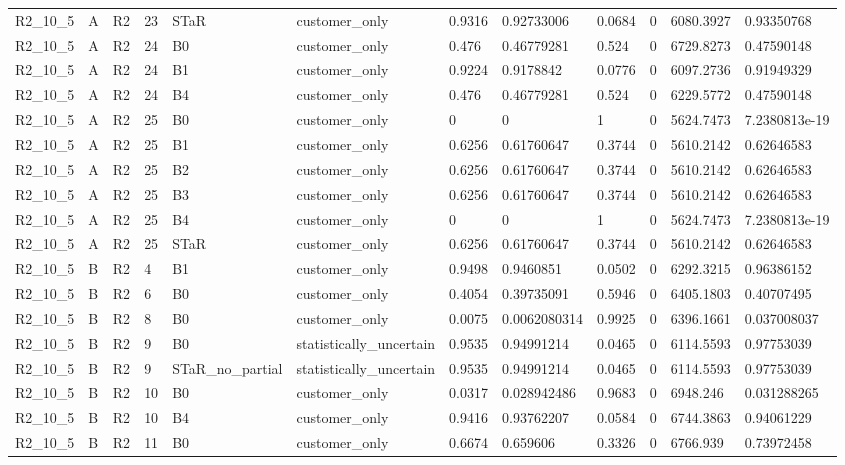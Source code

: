 \begin{longtable}{llllllllllll}
R2\_10\_5 & A & R2 & 23 & STaR & customer\_only & 0.9316 & 0.92733006 & 0.0684 & 0 & 6080.3927 & 0.93350768 \\
R2\_10\_5 & A & R2 & 24 & B0 & customer\_only & 0.476 & 0.46779281 & 0.524 & 0 & 6729.8273 & 0.47590148 \\
R2\_10\_5 & A & R2 & 24 & B1 & customer\_only & 0.9224 & 0.9178842 & 0.0776 & 0 & 6097.2736 & 0.91949329 \\
R2\_10\_5 & A & R2 & 24 & B4 & customer\_only & 0.476 & 0.46779281 & 0.524 & 0 & 6229.5772 & 0.47590148 \\
R2\_10\_5 & A & R2 & 25 & B0 & customer\_only & 0 & 0 & 1 & 0 & 5624.7473 & 7.2380813e-19 \\
R2\_10\_5 & A & R2 & 25 & B1 & customer\_only & 0.6256 & 0.61760647 & 0.3744 & 0 & 5610.2142 & 0.62646583 \\
R2\_10\_5 & A & R2 & 25 & B2 & customer\_only & 0.6256 & 0.61760647 & 0.3744 & 0 & 5610.2142 & 0.62646583 \\
R2\_10\_5 & A & R2 & 25 & B3 & customer\_only & 0.6256 & 0.61760647 & 0.3744 & 0 & 5610.2142 & 0.62646583 \\
R2\_10\_5 & A & R2 & 25 & B4 & customer\_only & 0 & 0 & 1 & 0 & 5624.7473 & 7.2380813e-19 \\
R2\_10\_5 & A & R2 & 25 & STaR & customer\_only & 0.6256 & 0.61760647 & 0.3744 & 0 & 5610.2142 & 0.62646583 \\
R2\_10\_5 & B & R2 & 4 & B1 & customer\_only & 0.9498 & 0.9460851 & 0.0502 & 0 & 6292.3215 & 0.96386152 \\
R2\_10\_5 & B & R2 & 6 & B0 & customer\_only & 0.4054 & 0.39735091 & 0.5946 & 0 & 6405.1803 & 0.40707495 \\
R2\_10\_5 & B & R2 & 8 & B0 & customer\_only & 0.0075 & 0.0062080314 & 0.9925 & 0 & 6396.1661 & 0.037008037 \\
R2\_10\_5 & B & R2 & 9 & B0 & statistically\_uncertain & 0.9535 & 0.94991214 & 0.0465 & 0 & 6114.5593 & 0.97753039 \\
R2\_10\_5 & B & R2 & 9 & STaR\_no\_partial & statistically\_uncertain & 0.9535 & 0.94991214 & 0.0465 & 0 & 6114.5593 & 0.97753039 \\
R2\_10\_5 & B & R2 & 10 & B0 & customer\_only & 0.0317 & 0.028942486 & 0.9683 & 0 & 6948.246 & 0.031288265 \\
R2\_10\_5 & B & R2 & 10 & B4 & customer\_only & 0.9416 & 0.93762207 & 0.0584 & 0 & 6744.3863 & 0.94061229 \\
R2\_10\_5 & B & R2 & 11 & B0 & customer\_only & 0.6674 & 0.659606 & 0.3326 & 0 & 6766.939 & 0.73972458 \\

\end{longtable}
